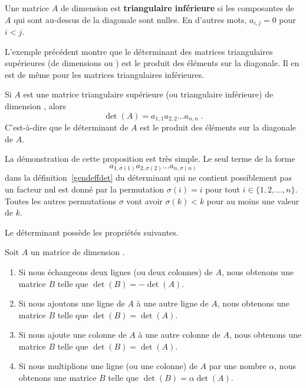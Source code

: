 {\begin{focus}{\dfn}
Une matrice $A$ de dimension \nn est
{\bfseries triangulaire inférieure} si les composantes de $A$ qui sont au-dessus de la
diagonale sont nulles.  En d'autres mots, $a_{i,j} =0$ pour $i<j$.
\end{focus}

L'exemple précédent montre que le déterminant des matrices
triangulaires supérieures (de dimensions  ou ) est
le produit des éléments sur la diagonale.  Il en est de même pour les
matrices triangulaires inférieures.

\begin{focus}{\prp}
Si $A$ est une matrice triangulaire supérieure (ou triangulaire
inférieure) de dimension \nn, alors
\[
\det(A) = a_{1,1}a_{2,2} \ldots a_{n,n} \; .
\]
C'est-à-dire que le déterminant de $A$ est le produit des éléments sur
la diagonale de $A$.
\end{focus}

\begin{rmk}[\theory]
La démonstration de cette proposition est très simple.  Le seul terme
de la forme
\[
a_{1,\sigma(1)}a_{2,\sigma(2)} \ldots a_{n,\sigma(n)}
\]
dans la définition~\ref{gendeffdet} du déterminant qui ne contient
possiblement pas un facteur nul est donné par la permutation
$\sigma(i) = i$ pour tout $i\in \{1,2,\ldots,n\}$.  Toutes les autres
permutations $\sigma$ vont avoir $\sigma(k) < k$ pour au moins une
valeur de $k$.
\end{rmk}

Le déterminant possède les propriétés suivantes.

\begin{focus}{\prp} \label{detProps}
Soit $A$ un matrice de dimension \nn.
\begin{enumerate}
\item Si nous échangeons deux lignes (ou deux colonnes) de $A$, nous obtenons
  une matrice $B$ telle que $\det(B) = - \det(A)$. 
\item Si nous ajoutons une ligne de $A$ à une autre ligne de $A$, nous
  obtenons une matrice $B$ telle que $\det(B) = \det(A)$. 
\item Si nous ajoute une colonne de $A$ à une autre colonne de $A$, nous
  obtenons une matrice $B$ telle que $\det(B) = \det(A)$.
\item Si nous multiplions une ligne (ou une colonne) de $A$ par une nombre
  $\alpha$, nous obtenons une matrice $B$ telle que
  $\det(B) = \alpha \det(A)$.
\end{enumerate}
\end{focus}

}
